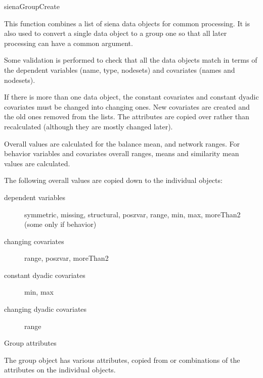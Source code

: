 \documentclass[12pt,a4paper]{article}
\makeatletter
\renewcommand{\=}{\,=\,}
\newcommand{\+}{\,+\,}
\renewcommand{\section}{\@startsection{section}{1}
                {0pt}{\baselineskip}{0.5\baselineskip}
                {\centering\sffamily} }
\renewcommand{\subsection}{\@startsection{subsection}{2}
                {0pt}{0.7\baselineskip}{0.3\baselineskip}
                {\sffamily} }
\makeatother
\begin{document}
\section{sienaGroupCreate}

This function combines a list of siena data objects for common processing. It is
also used to convert a single data object to a group one so that all later
processing can have a common argument.

Some validation is performed to check that all the data objects match in terms
of the dependent variables (name, type, nodesets) and covariates (names and
nodesets).

If there is more than one data object, the constant covariates and constant
dyadic covariates must be changed into changing ones. New covariates are created
and the old ones removed from the lists. The attributes are copied over rather
than recalculated (although they are mostly changed later).

Overall values are calculated for the balance mean, and network ranges. For
behavior variables and covariates overall ranges, means and similarity mean
values are calculated.

The following overall values are copied down to the individual objects:
\begin{description}

\item[dependent variables] symmetric, missing, structural, poszvar, range,
min, max, moreThan2 (some only if behavior)
\item[changing covariates] range,  poszvar, moreThan2
\item[constant dyadic covariates] min, max
\item[changing dyadic covariates] range

\end{description}
\subsection{Group attributes}

The group object has various attributes, copied from or combinations of the
attributes on the individual objects.
\end{document}
